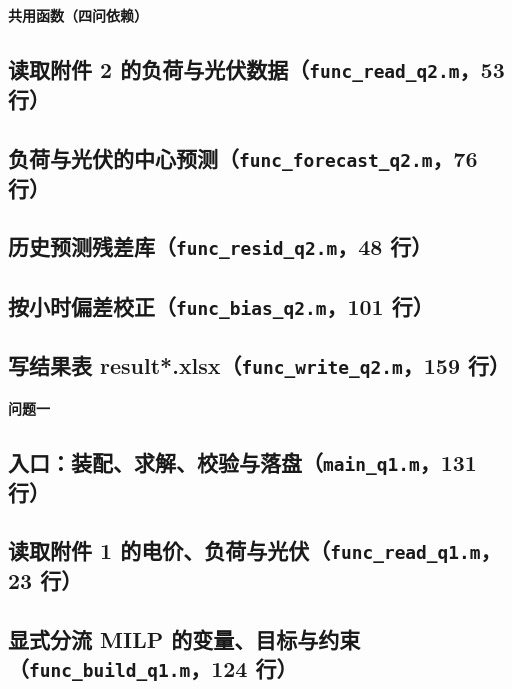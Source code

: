 
\begingroup\noindent\textbf{共用函数（四问依赖）}\par\endgroup

\subsection{读取附件 2 的负荷与光伏数据（\texttt{func_read_q2.m}，53 行）}

\subsection{负荷与光伏的中心预测（\texttt{func_forecast_q2.m}，76 行）}

\subsection{历史预测残差库（\texttt{func_resid_q2.m}，48 行）}

\subsection{按小时偏差校正（\texttt{func_bias_q2.m}，101 行）}

\subsection{写结果表 result*.xlsx（\texttt{func_write_q2.m}，159 行）}

\begingroup\noindent\textbf{问题一}\par\endgroup

\subsection{入口：装配、求解、校验与落盘（\texttt{main_q1.m}，131 行）}

\subsection{读取附件 1 的电价、负荷与光伏（\texttt{func_read_q1.m}，23 行）}

\subsection{显式分流 MILP 的变量、目标与约束（\texttt{func_build_q1.m}，124 行）}

